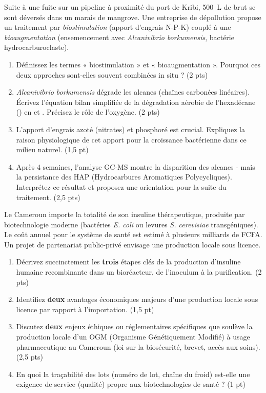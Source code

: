 \documentclass[11pt]{article}
\begin{document}
\begin{exercice}
Suite à une fuite sur un pipeline à proximité du port de Kribi, \SI{500}{\liter} de brut se sont déversés dans un marais de mangrove. Une entreprise de dépollution propose un traitement par \textit{biostimulation} (apport d'engrais N-P-K) couplé à une \textit{bioaugmentation} (ensemencement avec \textit{Alcanivibrio borkumensis}, bactérie hydrocarburoclaste).

\begin{enumerate}
    \item Définissez les termes « biostimulation » et « bioaugmentation ». Pourquoi ces deux approches sont-elles souvent combinées in situ ? (2 pts)
    \item \textit{Alcanivibrio borkumensis} dégrade les alcanes (chaînes carbonées linéaires). Écrivez l'équation bilan simplifiée de la dégradation aérobie de l'hexadécane () en  et . Précisez le rôle de l'oxygène. (2 pts)
    \item L'apport d'engrais azoté (nitrates) et phosphoré est crucial. Expliquez la raison physiologique de cet apport pour la croissance bactérienne dans ce milieu naturel. (1,5 pt)
    \item Après 4 semaines, l'analyse GC-MS montre la disparition des alcanes - mais la persistance des HAP (Hydrocarbures Aromatiques Polycycliques). Interprétez ce résultat et proposez une orientation pour la suite du traitement. (2,5 pts)
\end{enumerate}
\end{exercice}

\begin{exercice}
Le Cameroun importe la totalité de son insuline thérapeutique, produite par biotechnologie moderne (bactéries \textit{E. coli} ou levures \textit{S. cerevisiae} transgéniques). Le coût annuel pour le système de santé est estimé à plusieurs milliards de FCFA. Un projet de partenariat public-privé envisage une production locale sous licence.

\begin{enumerate}
    \item Décrivez succinctement les \textbf{trois} étapes clés de la production d'insuline humaine recombinante dans un bioréacteur, de l'inoculum à la purification. (2 pts)
    \item Identifiez \textbf{deux} avantages économiques majeurs d'une production locale sous licence par rapport à l'importation. (1,5 pt)
    \item Discutez \textbf{deux} enjeux éthiques ou réglementaires spécifiques que soulève la production locale d'un OGM (Organisme Génétiquement Modifié) à usage pharmaceutique au Cameroun (loi sur la biosécurité, brevet, accès aux soins). (2,5 pts)
    \item En quoi la traçabilité des lots (numéro de lot, chaîne du froid) est-elle une exigence de service (qualité) propre aux biotechnologies de santé ? (1 pt)
\end{enumerate}
\end{exercice}
\end{document}
